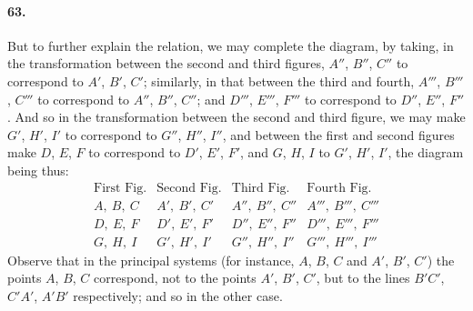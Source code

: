 \documentclass[11pt]{article}
\begin{document}
\medskip

\paragraph{63.}
But to further explain the relation, we may complete the diagram, by
taking, in the transformation between the second and third figures,
$A''$, $B''$, $C''$ to correspond to $A'$, $B'$, $C'$; similarly, in that
between the third and fourth, $A'''$, $B'''$, $C'''$ to correspond to
$A''$, $B''$, $C''$; and $D'''$, $E'''$, $F'''$ to correspond to $D''$,
$E''$, $F''$. And so in the transformation between the second and third
figure, we may make $G'$, $H'$, $I'$ to correspond to $G''$, $H''$,
$I''$, and between the first and second figures make $D$, $E$, $F$ to
correspond to $D'$, $E'$, $F'$, and $G$, $H$, $I$ to $G'$, $H'$, $I'$,
the diagram being thus:
\[
\begin{array}{llll}
\text{First Fig.} & \text{Second Fig.} & \text{Third Fig.} & \text{Fourth Fig.}\\
A,\ B,\ C         & A',\ B',\ C'        & A'',\ B'',\ C''     & A''',\ B''',\ C'''\\
D,\ E,\ F         & D',\ E',\ F'        & D'',\ E'',\ F''     & D''',\ E''',\ F'''\\
G,\ H,\ I         & G',\ H',\ I'        & G'',\ H'',\ I''     & G''',\ H''',\ I'''
\end{array}
\]
Observe that in the principal systems (for instance, $A$, $B$, $C$ and
$A'$, $B'$, $C'$) the points $A$, $B$, $C$ correspond, not to the points
$A'$, $B'$, $C'$, but to the lines $B'C'$, $C'A'$, $A'B'$ respectively;
and so in the other case.

\medskip
\end{document}
